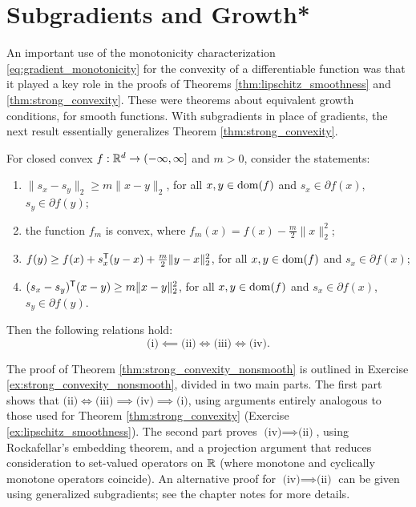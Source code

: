 \section{Subgradients and Growth*}

An important use of the monotonicity characterization
\eqref{eq:gradient_monotonicity} for the convexity of a differentiable function
was that it played a key role in the proofs of Theorems
\ref{thm:lipschitz_smoothness} and \ref{thm:strong_convexity}. These were
theorems about equivalent growth conditions, for smooth functions. With
subgradients in place of gradients, the next result essentially generalizes
Theorem \ref{thm:strong_convexity}. 

\begin{Theorem}
\label{thm:strong_convexity_nonsmooth}
For closed convex $f : \mathbb{R}^d \to (-\infty, \infty]$ and $m>0$, consider the
statements:     
\begin{enumerate}[label=(\roman*)]
\item $\|s_x - s_y\|_2 \geq m \|x-y\|_2$, for all $x,y \in \operatorname{dom}(f)$ and 
  $s_x \in \partial f(x)$, $s_y \in \partial f(y)$;  
\item the function $f_m$ is convex, where $f_m(x) = f(x) - \frac{m}{2}
  \|x\|_2^2$;    
\item $f(y) \geq f(x) + s_x^{\mathsf{T}} (y-x) + \frac{m}{2} \|y-x\|_2^2$, for all $x,y
  \in \operatorname{dom}(f)$ and $s_x \in \partial f(x)$; 
\item $(s_x - s_y)^{\mathsf{T}} (x - y) \geq m\|x-y\|_2^2$, for all $x,y \in \operatorname{dom}(f)$ and
  $s_x \in \partial f(x)$, $s_y \in \partial f(y)$.  
\end{enumerate}
Then the following relations hold: 
\[
\text{(i)} \impliedby \text{(ii)} \iff \text{(iii)} \iff \text{(iv)}.
\]
\end{Theorem}

The proof of Theorem \ref{thm:strong_convexity_nonsmooth} is outlined in
Exercise \ref{ex:strong_convexity_nonsmooth}, divided in two main parts. The
first part shows that $\text{(ii)} \iff \text{(iii)} \implies \text{(iv)}
\implies \text{(i)}$, using arguments entirely analogous to those used for
Theorem \ref{thm:strong_convexity} (Exercise \ref{ex:lipschitz_smoothness}). The
second part proves $\text{(iv)} \implies \text{(ii)}$, using Rockafellar's
embedding theorem, and a projection argument that reduces consideration to
set-valued operators on $\mathbb{R}$ (where monotone and cyclically monotone operators
coincide). An alternative proof for $\text{(iv)} \implies \text{(ii)}$ can be
given using generalized subgradients; see the chapter notes for more details.

